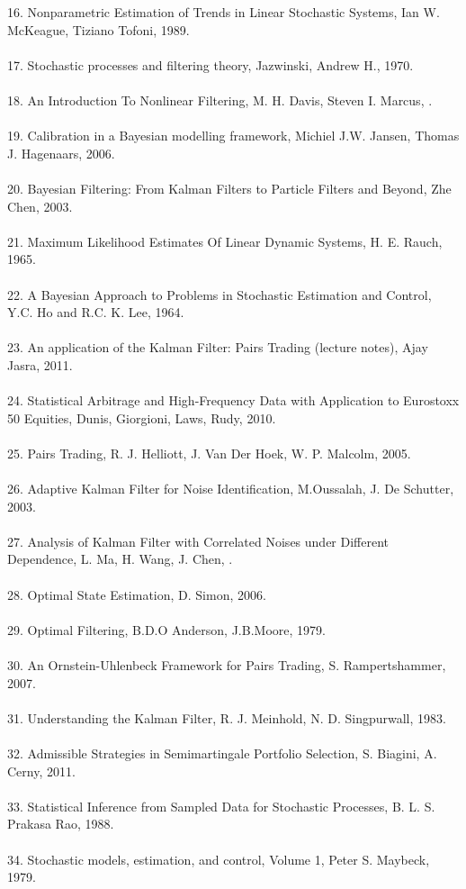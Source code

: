 \documentclass{article}
\theoremstyle{definition}
\theoremstyle{remark}
\begin{document}
16. Nonparametric Estimation of Trends in Linear Stochastic Systems, Ian W. McKeague, Tiziano Tofoni, 1989. \\%
\\
17. Stochastic processes and filtering theory, Jazwinski, Andrew H., 1970.\\
\\
18. An Introduction To Nonlinear Filtering, M. H. Davis, Steven I. Marcus, .\\
\\
19. Calibration in a Bayesian modelling framework, Michiel J.W. Jansen, Thomas J. Hagenaars, 2006.\\
\\
20. Bayesian Filtering: From Kalman Filters to Particle Filters and Beyond, Zhe Chen, 2003.\\
\\
21. Maximum Likelihood Estimates Of Linear Dynamic Systems, H. E. Rauch, 1965.\\
\\
22. A Bayesian Approach to Problems in Stochastic Estimation and Control, Y.C. Ho and R.C. K. Lee, 1964.\\
\\
23. An application of the Kalman Filter: Pairs Trading (lecture notes), Ajay Jasra, 2011.\\
\\
24. Statistical Arbitrage and High-Frequency Data with Application to Eurostoxx 50 Equities, Dunis, Giorgioni, Laws, Rudy, 2010.\\
\\
25. Pairs Trading, R. J. Helliott, J. Van Der Hoek, W. P. Malcolm, 2005.\\
\\
26. Adaptive Kalman Filter for Noise Identification, M.Oussalah, J. De Schutter, 2003. \\
\\
27. Analysis of Kalman Filter with Correlated Noises under Different Dependence, L. Ma, H. Wang, J. Chen, .\\
\\
28. Optimal State Estimation,  D. Simon, 2006.\\
\\
29. Optimal Filtering, B.D.O Anderson, J.B.Moore, 1979.\\
\\
30. An Ornstein-Uhlenbeck Framework for Pairs Trading, S. Rampertshammer, 2007.\\
\\
31. Understanding the Kalman Filter, R. J. Meinhold, N. D. Singpurwall, 1983.\\
\\
32. Admissible Strategies in Semimartingale Portfolio Selection, S. Biagini, A. Cerny, 2011.\\
\\
33. Statistical Inference from Sampled Data for Stochastic Processes, B. L. S. Prakasa Rao, 1988.\\
\\
34. Stochastic models, estimation, and control, Volume 1, Peter S. Maybeck, 1979.
\end{document}

